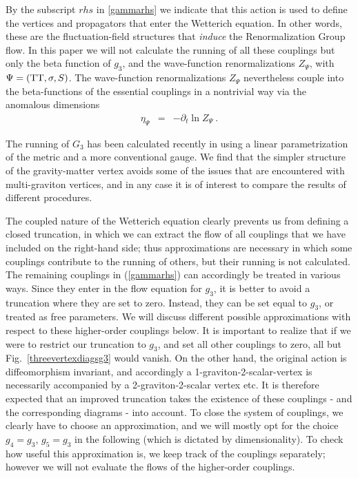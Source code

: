 \documentclass[twocolumn,prd,superscriptaddress,preprintnumbers,amsmath,amssymb,nofootinbib]{revtex4}
\newcommand{\bea}{\begin{eqnarray}}
\newcommand{\eea}{\end{eqnarray}}
\begin{document}
By the subscript $rhs$ in \eqref{gammarhs} we indicate that this action is used to define the vertices and propagators that enter the Wetterich equation.  In other words, these are the fluctuation-field structures that \emph{induce} the Renormalization Group flow.
In this paper we will not calculate the running of all these couplings but only the beta function of $g_3$, and the wave-function renormalizations $Z_\Psi$, with $\Psi=({\rm TT},\sigma,S)$.
The wave-function renormalizations $Z_\Psi$ nevertheless couple into the beta-functions of the essential couplings in a nontrivial way via the anomalous dimensions
\bea
\eta_\Psi &=&-\partial_t\ln Z_\Psi\ .
\eea

The running of $G_3$ has been calculated recently in \cite{Meibohm:2015twa} using a linear parametrization of the metric
and a more conventional gauge.
We find that the simpler structure of the gravity-matter vertex
avoids some of the issues that are encountered with multi-graviton vertices, and in any case it is of interest to compare the results of different procedures.

The coupled nature of the Wetterich equation clearly prevents us from defining a closed truncation, in which we can extract the flow of all couplings that we have included on the right-hand side; thus approximations are necessary in which some couplings contribute to the running of others, but their running is not calculated. 
The remaining couplings in (\ref{gammarhs}) 
can accordingly be treated in various ways.
Since they enter in the flow equation for $g_3$,
it is better to avoid a truncation where they are set to zero.
Instead, they can be set equal to $g_3$, or treated as free parameters.
We will discuss different possible approximations with respect to these higher-order couplings below.
It is important to realize that if we were to restrict our truncation to $g_3$, and set all other couplings to zero, all but 
Fig.~\ref{threevertexdiagsg3} would vanish. On the other hand, the original action is diffeomorphism invariant, and accordingly a 1-graviton-2-scalar-vertex is necessarily accompanied by a 2-graviton-2-scalar vertex etc. It is therefore expected that an improved truncation takes the existence of these couplings - and the corresponding diagrams - into account. To close the system of couplings, we clearly have to choose an approximation, and we will mostly opt for the choice $g_4=g_3$, $g_5=g_3$ in the following (which is dictated by dimensionality). To check how useful this approximation is, we keep track of the couplings separately; however we will not evaluate the flows of the higher-order couplings.
\end{document}
